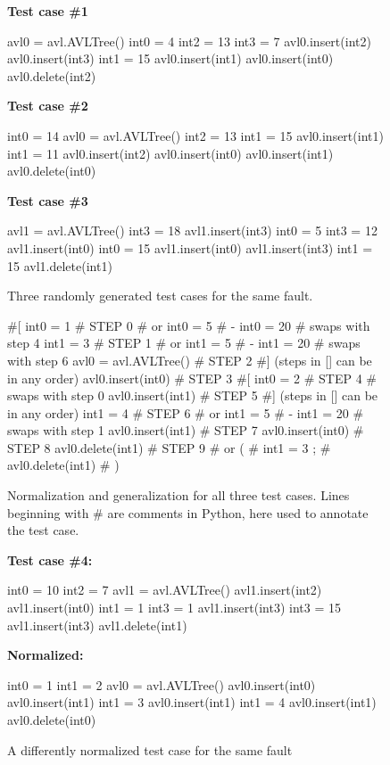 \begin{figure}
{\scriptsize
{\bf Test case \#1}
\begin{code}
avl0 = avl.AVLTree() 
int0 = 4 
int2 = 13 
int3 = 7 
avl0.insert(int2) 
avl0.insert(int3) 
int1 = 15 
avl0.insert(int1) 
avl0.insert(int0) 
avl0.delete(int2)
\end{code}
{\bf Test case \#2}
\begin{code}
int0 = 14 
avl0 = avl.AVLTree() 
int2 = 13 
int1 = 15 
avl0.insert(int1) 
int1 = 11 
avl0.insert(int2) 
avl0.insert(int0) 
avl0.insert(int1) 
avl0.delete(int0) 
\end{code}
{\bf Test case \#3}
\begin{code}
avl1 = avl.AVLTree() 
int3 = 18 
avl1.insert(int3) 
int0 = 5 
int3 = 12 
avl1.insert(int0) 
int0 = 15 
avl1.insert(int0) 
avl1.insert(int3) 
int1 = 15 
avl1.delete(int1) 
\end{code}
}
\caption {Three randomly generated test cases for the same fault.}
\label{threetests}
\end{figure}

\begin{figure}
{\scriptsize
\begin{code}
\#[
int0 = 1                       \# STEP 0
\#  or int0 = 5 
\#   - int0 = 20 
\#  swaps with step 4
int1 = 3                       \# STEP 1
\#  or int1 = 5 
\#   - int1 = 20 
\#  swaps with step 6
avl0 = avl.AVLTree()           \# STEP 2
\#] (steps in [] can be in any order)
avl0.insert(int0)              \# STEP 3
\#[
int0 = 2                       \# STEP 4
\#  swaps with step 0
avl0.insert(int1)              \# STEP 5
\#] (steps in [] can be in any order)
int1 = 4                       \# STEP 6
\#  or int1 = 5 
\#   - int1 = 20 
\#  swaps with step 1
avl0.insert(int1)              \# STEP 7
avl0.insert(int0)              \# STEP 8
avl0.delete(int1)              \# STEP 9
\#  or (
\#      int1 = 3  ;
\#      avl0.delete(int1) 
\#     )
\end{code}
}
\caption{Normalization and generalization for all three test cases.
  Lines beginning with \# are comments in Python, here used to
annotate the test case.}
\label{normalgen}
\end{figure}

\begin{figure}
{\scriptsize
{\bf Test case \#4:}
\begin{code}
int0 = 10 
int2 = 7 
avl1 = avl.AVLTree() 
avl1.insert(int2) 
avl1.insert(int0) 
int1 = 1 
int3 = 1 
avl1.insert(int3) 
int3 = 15 
avl1.insert(int3) 
avl1.delete(int1) 
\end{code}
{\bf Normalized:}
\begin{code}
int0 = 1
int1 = 2
avl0 = avl.AVLTree()
avl0.insert(int0) 
avl0.insert(int1) 
int1 = 3  
avl0.insert(int1) 
int1 = 4  
avl0.insert(int1)  
avl0.delete(int0) 
\end{code}
}
\caption{A differently normalized test case for the same fault}
\label{diffnorm}
\end{figure}